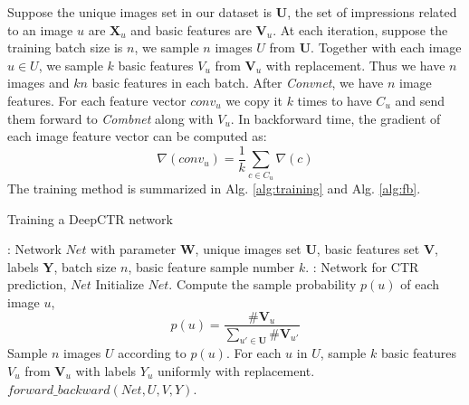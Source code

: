\documentclass{sig-alternate}
\begin{document}
Suppose the unique  images set in our dataset is $\mathbf{U}$, the set of impressions related to an image $u$ are $\mathbf{X}_{u}$ and basic features are $\mathbf{V}_{u}$. At each iteration, suppose the training batch size is $n$, we sample $n$ images $U$ from $\mathbf{U}$. Together with each image $u \in U$, we sample $k$ basic features $V_{u}$ from $\mathbf{V}_{u}$ with replacement. Thus we have $n$ images and $kn$ basic features in each batch.   After \emph{Convnet}, we have $n$ image features. For each feature vector $conv_{u}$ we copy it $k$ times to have $C_{u}$ and send them forward to \emph{Combnet} along with $V_{u}$. In backforward time, the gradient of each image feature vector can be computed as:
\begin{equation}\label{eq:gradient}
\nabla(conv_{u}) = \frac{1}{k} \sum_{c \in C_{u}} \nabla(c)  
\end{equation}
The training method is summarized in Alg. \ref{alg:training} and Alg. \ref{alg:fb}.
\begin{algorithm}[tb]
	\caption{Training a DeepCTR network}
	\label{alg:training}
	\begin{algorithmic}[1]
		\renewcommand{\algorithmicrequire}{\textbf{Input:}}
		\renewcommand{\algorithmicensure}{\textbf{Output:}}
		\Require: Network $Net$ with parameter $\mathbf{W}$, unique images set $\mathbf{U}$, basic features set $\mathbf{V}$, labels $\mathbf{Y}$, batch size $n$, basic feature sample number $k$.  
		\Ensure: Network for CTR prediction, $Net$
		\State Initialize $Net$.
		\State Compute the sample probability $p(u)$ of each image $u$,
		\begin{equation}
		p(u) = \frac{\# \mathbf{V}_{u}}{\sum_{u' \in \mathbf{U}} \# \mathbf{V}_{u'}}
		\end{equation}
		\Repeat
		\State Sample $n$ images $U$ according to $p(u)$. 
		\State For each $u$ in $U$, sample $k$ basic features $V_{u}$ from $\mathbf{V}_{u}$ with labels $Y_{u}$ uniformly with replacement. 
		\State $forward\_backward(Net, U, V, Y)$.
	\end{algorithmic}
\end{algorithm}  
\end{document}
